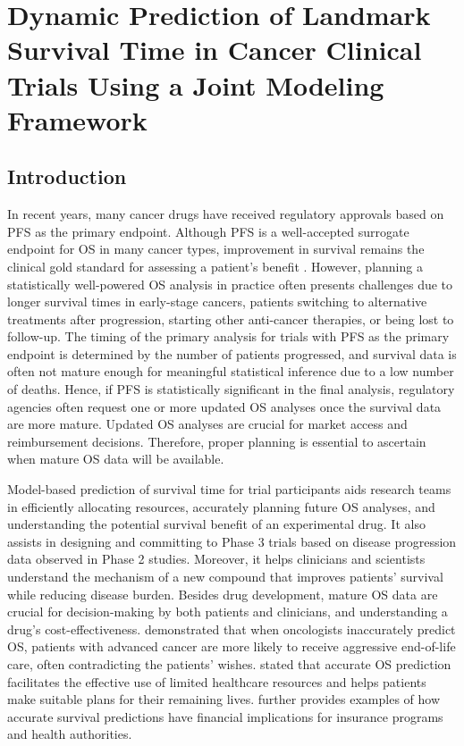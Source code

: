 \chapter{Dynamic Prediction of Landmark Survival Time in Cancer Clinical Trials Using a Joint Modeling Framework}
\label{chpt:survival}

\section{Introduction}
In recent years, many cancer drugs have received regulatory approvals based on \ac{PFS} as the primary endpoint. Although \ac{PFS} is a well-accepted surrogate endpoint for \ac{OS} in many cancer types, improvement in survival remains the clinical gold standard for assessing a patient's benefit \citep{tang2007surrogate, driscoll2009overall, methy2010surrogate, grigore2020surrogate}. However, planning a statistically well-powered \ac{OS} analysis in practice often presents challenges due to longer survival times in early-stage cancers, patients switching to alternative treatments after progression, starting other anti-cancer therapies, or being lost to follow-up. The timing of the primary analysis for trials with \ac{PFS} as the primary endpoint is determined by the number of patients progressed, and survival data is often not mature enough for meaningful statistical inference due to a low number of deaths. Hence, if \ac{PFS} is statistically significant in the final analysis, regulatory agencies often request one or more updated \ac{OS} analyses once the survival data are more mature. Updated \ac{OS} analyses are crucial for market access and reimbursement decisions. Therefore, proper planning is essential to ascertain when mature \ac{OS} data will be available.

Model-based prediction of survival time for trial participants aids research teams in efficiently allocating resources, accurately planning future \ac{OS} analyses, and understanding the potential survival benefit of an experimental drug. It also assists in designing and committing to Phase 3 trials based on disease progression data observed in Phase 2 studies. Moreover, it helps clinicians and scientists understand the mechanism of a new compound that improves patients' survival while reducing disease burden. Besides drug development, mature \ac{OS} data are crucial for decision-making by both patients and clinicians, and understanding a drug's cost-effectiveness. \cite{sborov2019impact} demonstrated that when oncologists inaccurately predict \ac{OS}, patients with advanced cancer are more likely to receive aggressive end-of-life care, often contradicting the patients' wishes. \cite{mackillop1997measuring} stated that accurate \ac{OS} prediction facilitates the effective use of limited healthcare resources and helps patients make suitable plans for their remaining lives. \cite{henderson2001accuracy} further provides examples of how accurate survival predictions have financial implications for insurance programs and health authorities.

